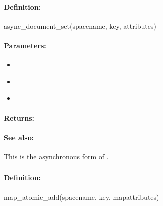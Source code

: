 \paragraph{Definition:}
\begin{rubycode}
async_document_set(spacename, key, attributes)
\end{rubycode}

\paragraph{Parameters:}
\begin{itemize}[noitemsep]
\item {}\\

\item {}\\

\item {}\\

\end{itemize}

\paragraph{Returns:}


\paragraph{See also:}  This is the asynchronous form of .

\pagebreak
\subsubsection{}
\label{api:ruby:map_atomic_add}


\paragraph{Definition:}
\begin{rubycode}
map_atomic_add(spacename, key, mapattributes)
\end{rubycode}

